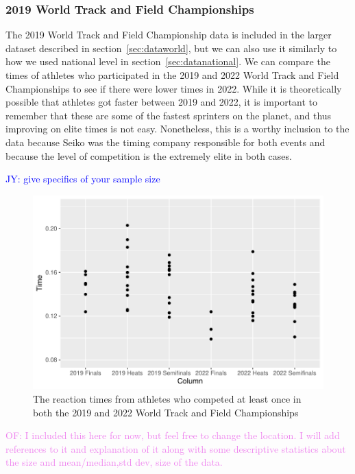 \documentclass[12pt, letterpaper, titlepage]{article}
\newcommand{\jy}[1]{\textcolor{blue}{JY: #1}}
\newcommand{\of}[1]{\textcolor{violet}{OF: #1}}
\begin{document}
\subsubsection{2019 World Track and Field Championships}\label{sec:data2019}
The 2019 World Track and Field Championship data is included in the larger dataset
described in section~\ref{sec:dataworld}, but we can also use it similarly to
how we used national level in section~\ref{sec:datanational}.  We can compare
the times of athletes who participated in the 2019 and 2022 World Track and Field
Championships to see if there were lower times in 2022.  While it is theoretically
possible that athletes got faster between 2019 and 2022, it is important to
remember that these are some of the fastest sprinters on the planet, and thus
improving on elite times is not easy.  Nonetheless, this is a worthy inclusion
to the data because Seiko was the timing company responsible for both events and
because the level of competition is the extremely elite in both cases. 

\jy{give specifics of your sample size}

\begin{figure}[tbp]
  \centering
  \includegraphics{Scatterplot2019vs2022}
  \caption{The reaction times from athletes who competed at least once in both 
  the 2019 and 2022 World Track and Field Championships}
  \label{fig:Scatterplot2019vs2022}
\end{figure}
\of{I included this here for now, but feel free to change the location.  I will
add references to it and explanation of it along with some descriptive statistics about
the size and mean/median,std dev, size of the data.}
\end{document}
